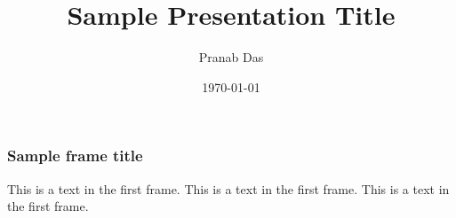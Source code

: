 \documentclass{beamer}
\title{Sample Presentation Title}
\author{Pranab Das}
\institute{National University of Singapore}
\date{\today}
\begin{document}
\frame{\titlepage}

\begin{frame}
\frametitle{Sample frame title}
This is a text in the first frame. This is a text in the first frame. This is a text in the first frame.
\end{frame}
\end{document}
